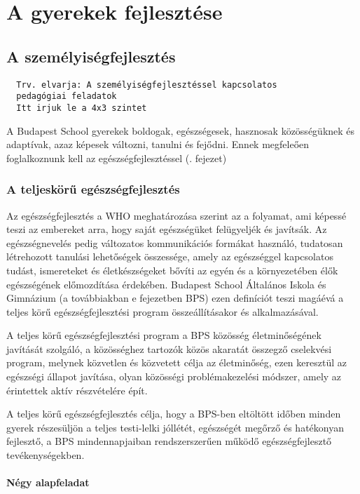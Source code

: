 \chapter{A gyerekek fejlesztése}
\section{A
személyiségfejlesztés}
\begin{verbatim}
  Trv. elvarja: A személyiségfejlesztéssel kapcsolatos
  pedagógiai feladatok
  Itt irjuk le a 4x3 szintet
\end{verbatim}

A Budapest School gyerekek boldogak, egészségesek, hasznosak közösségüknek és adaptívak, azaz képesek változni, tanulni és fejődni. Ennek megfeleően foglalkoznunk kell az egészségfejlesztéssel (. fejezet)

\subsection{A teljeskörű
egészségfejlesztés}\label{sec:egeszsegfejlesztes}

Az egészségfejlesztés a WHO meghatározása szerint az a folyamat, ami
képessé teszi az embereket arra, hogy saját egészségüket felügyeljék és
javítsák. Az egészségnevelés pedig változatos kommunikációs formákat
használó, tudatosan létrehozott tanulási lehetőségek összessége, amely
az egészséggel kapcsolatos tudást, ismereteket és életkészségeket bővíti
az egyén és a környezetében élők egészségének előmozdítása érdekében.
Budapest School Általános Iskola és Gimnázium (a továbbiakban e
fejezetben BPS) ezen definíciót teszi magáévá a teljes körű
egészségfejlesztési program összeállításakor és alkalmazásával.

A teljes körű egészségfejlesztési program a BPS közösség életminőségének
javítását szolgáló, a közösséghez tartozók közös akaratát összegző
cselekvési program, melynek közvetlen és közvetett célja az életminőség,
ezen keresztül az egészségi állapot javítása, olyan közösségi
problémakezelési módszer, amely az érintettek aktív részvételére épít.

A teljes körű egészségfejlesztés célja, hogy a BPS-ben eltöltött időben
minden gyerek részesüljön a teljes testi-lelki jóllétét, egészségét
megőrző és hatékonyan fejlesztő, a BPS mindennapjaiban rendszerszerűen
működő egészségfejlesztő tevékenységekben.

\subsubsection{Négy alapfeladat}\label{nuxe9gy-alapfeladat}

